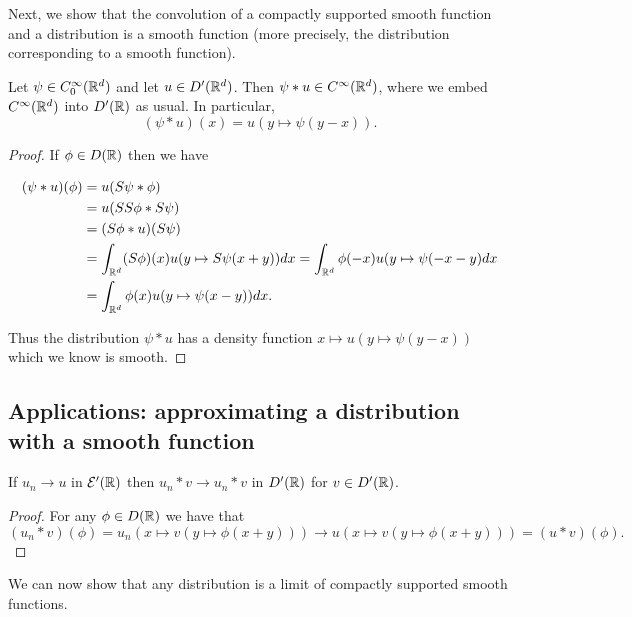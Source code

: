 \documentclass[twoside, a4paper, 10pt]{amsart}
\begin{document}
Next, we show that the convolution of a compactly supported smooth function and a distribution is a smooth function (more precisely, the distribution corresponding to a smooth function).

\begin{thm}  Let $\psi \in C_0^{\infty}(\mathbb{R}^d)$ and let $u \in D'(\mathbb{R}^d)$. Then $\psi * u \in C^{\infty}(\mathbb{R}^d)$, where we embed $C^{\infty}(\mathbb{R}^d)$ into $D'(\mathbb{R})$ as usual. In particular, $$(\psi * u) (x) = u(y \mapsto \psi(y-x)) .$$

\end{thm}

\begin{proof} If $\phi \in D(\mathbb{R})$ then we have 

\begin{align*} (\psi * u)(\phi) &= u(S\psi * \phi) \\ &= u(SS\phi * S\psi) \\ &= (S\phi * u)(S\psi) \\ &= \int_{\mathbb{R}^d} (S\phi) (x) u(y \mapsto S\psi(x+y)) dx = \int_{\mathbb{R}^d} \phi(-x) u(y \mapsto \psi(-x-y) dx \\ &= \int_{\mathbb{R}^d} \phi(x) u(y \mapsto \psi(x-y)) dx. \end{align*}

Thus the distribution $\psi * u$ has a density function $x \mapsto u(y \mapsto \psi(y-x))$ which we know is smooth.

\end{proof}

\subsection{Applications: approximating a distribution with a smooth function}

\begin{lemma} If $u_n \to u$ in $\mathcal{E}'(\mathbb{R})$ then $u_n * v \to u_n * v$ in $D'(\mathbb{R})$ for $v \in D'(\mathbb{R})$. 

\end{lemma}

\begin{proof} For any $\phi \in D(\mathbb{R})$ we have that $$(u_n * v)(\phi) = u_n(x \mapsto v(y \mapsto \phi(x+y))) \to u(x \mapsto v(y \mapsto \phi(x+y))) = (u*v)(\phi).$$

\end{proof}

We can now show that any distribution is a limit of compactly supported smooth functions.
\end{document}
